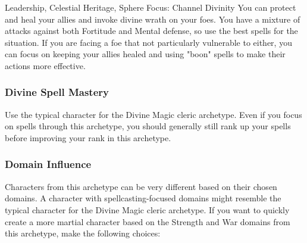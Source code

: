             Leadership, Celestial Heritage, Sphere Focus: Channel Divinity
             You can protect and heal your allies and invoke divine wrath on your foes.
            You have a mixture of attacks against both Fortitude and Mental defense, so use the best spells for the situation.
            If you are facing a foe that not particularly vulnerable to either, you can focus on keeping your allies healed and using "boon" spells to make their actions more effective.

        \subsubsection{Divine Spell Mastery}
            Use the typical character for the Divine Magic cleric archetype.
            Even if you focus on spells through this archetype, you should generally still rank up your spells before improving your rank in this archetype.

        \subsubsection{Domain Influence}
            Characters from this archetype can be very different based on their chosen domains.
            A character with spellcasting-focused domains might resemble the typical character for the Divine Magic cleric archetype.
            If you want to quickly create a more martial character based on the Strength and War domains from this archetype, make the following choices:

